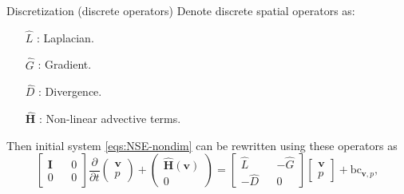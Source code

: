 \documentclass{beamer}
\begin{document}
	\begin{frame}{Discretization (discrete operators)}
	Denote discrete spatial operators as:
\begin{enumerate}
	\item[$\hat{L}$]:  Laplacian.
	\item[$\hat{G}$]: Gradient.
	\item[$\hat{D}$]: Divergence.
	\item[$\mathbf{\hat{H}}$]: Non-linear advective terms.
\end{enumerate}
Then initial system \eqref{eqs:NSE-nondim} can be rewritten using these operators as
\begin{equation}\label{eqn:nse-matrix}
            \begin{bmatrix}
                  \mathbf{I} && 0 \\ 
                  0 && 0
            \end{bmatrix}
            \frac{\partial }{\partial t} 
            \begin{pmatrix}
                  \boldsymbol{v} \\ 
                  p
            \end{pmatrix}
            +
            \begin{pmatrix}
                  \mathbf{\hat{H}}(\boldsymbol{v})\\
                  0
            \end{pmatrix}
            =
            \begin{bmatrix}
                  \hat{L} && - \hat{G} \\ 
                  -\hat{D} && 0
            \end{bmatrix}
            \begin{bmatrix}
                  \boldsymbol{v} \\
                  p
            \end{bmatrix}
             + \text{bc}_{\boldsymbol{v},p},
        \end{equation}	
	\end{frame}
	
\end{document}
